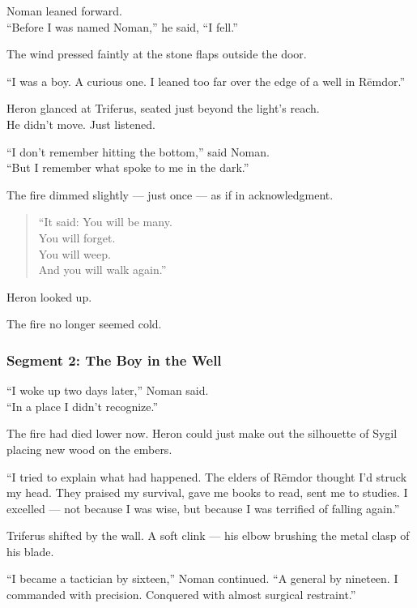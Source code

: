 \documentclass[9pt]{article}
\begin{document}
Noman leaned forward.\\
“Before I was named Noman,” he said, “I fell.”

The wind pressed faintly at the stone flaps outside the door.

“I was a boy. A curious one. I leaned too far over the edge of a well in Rēmdor.”

Heron glanced at Triferus, seated just beyond the light’s reach.\\
He didn’t move. Just listened.

“I don’t remember hitting the bottom,” said Noman.\\
“But I remember what spoke to me in the dark.”

The fire dimmed slightly — just once — as if in acknowledgment.

\begin{quote}
“It said: You will be many.\\
You will forget.\\
You will weep.\\
And you will walk again.”
\end{quote}

Heron looked up.

The fire no longer seemed cold.

\newpage

\subsubsection*{Segment 2: The Boy in the Well}

“I woke up two days later,” Noman said.\\
“In a place I didn’t recognize.”

The fire had died lower now. Heron could just make out the silhouette of Sygil placing new wood on the embers.

“I tried to explain what had happened. The elders of Rēmdor thought I’d struck my head. They praised my survival, gave me books to read, sent me to studies. I excelled — not because I was wise, but because I was terrified of falling again.”

\vspace{1em}

Triferus shifted by the wall. A soft clink — his elbow brushing the metal clasp of his blade.

“I became a tactician by sixteen,” Noman continued. “A general by nineteen. I commanded with precision. Conquered with almost surgical restraint.”
\end{document}
